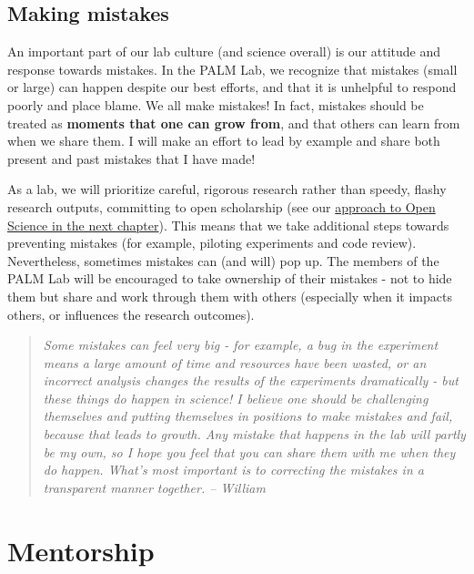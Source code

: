 \documentclass[
]{book}
\begin{document}
\hypertarget{making-mistakes}{%
\subsection*{Making mistakes}\label{making-mistakes}}

An important part of our lab culture (and science overall) is our attitude and response towards mistakes. In the PALM Lab, we recognize that mistakes (small or large) can happen despite our best efforts, and that it is unhelpful to respond poorly and place blame. We all make mistakes! In fact, mistakes should be treated as \textbf{moments that one can grow from}, and that others can learn from when we share them. I will make an effort to lead by example and share both present and past mistakes that I have made!

As a lab, we will prioritize careful, rigorous research rather than speedy, flashy research outputs, committing to open scholarship (see our \protect\hyperlink{open-science}{approach to Open Science in the next chapter}). This means that we take additional steps towards preventing mistakes (for example, piloting experiments and code review). Nevertheless, sometimes mistakes can (and will) pop up. The members of the PALM Lab will be encouraged to take ownership of their mistakes - not to hide them but share and work through them with others (especially when it impacts others, or influences the research outcomes).

\begin{quote}
\emph{Some mistakes can \emph{feel} very big - for example, a bug in the experiment means a large amount of time and resources have been wasted, or an incorrect analysis changes the results of the experiments dramatically - but these things do happen in science! I believe one should be challenging themselves and putting themselves in positions to make mistakes and fail, because that leads to growth. Any mistake that happens in the lab will partly be my own, so I hope you feel that you can share them with me when they do happen. What's most important is to correcting the mistakes in a transparent manner together. -- William}
\end{quote}

\hypertarget{lab-mentorship}{%
\section{Mentorship}\label{lab-mentorship}}
\end{document}
